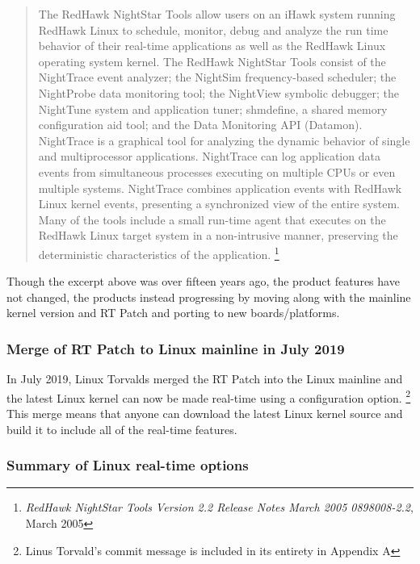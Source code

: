 \documentclass[12pt]{article}
\begin{document}
\begin{quote}
The RedHawk NightStar Tools allow users on an iHawk system running
RedHawk Linux to schedule, monitor, debug and analyze the run time behavior of
their real-time applications as well as the RedHawk Linux operating system
kernel.  The RedHawk NightStar Tools consist of the NightTrace event analyzer;
the NightSim frequency-based scheduler; the NightProbe data monitoring tool; the
NightView symbolic debugger; the NightTune system and application tuner;
shmdefine, a shared memory configuration aid tool; and the Data Monitoring API
(Datamon).  NightTrace is a graphical tool for analyzing the dynamic behavior of
single and multiprocessor applications. NightTrace can log application data
events from simultaneous processes executing on multiple CPUs or even multiple
systems. NightTrace combines application events with RedHawk Linux kernel
events, presenting a synchronized view of the entire system.  Many of the tools
include a small run-time agent that executes on the RedHawk Linux target system
in a non-intrusive manner, preserving the deterministic characteristics of the
application.%
\footnote{\emph{RedHawk NightStar Tools Version 2.2 Release Notes March 2005
0898008-2.2}, March 2005}
\end{quote}

Though the excerpt above was over fifteen years ago, the product features have
not changed, the products instead progressing by moving along with the mainline
kernel version and RT Patch and porting to new boards/platforms.

\subsubsection{Merge of RT Patch to Linux mainline in July 2019}
In July 2019, Linux Torvalds merged the RT Patch into the Linux mainline and the
latest Linux kernel can now be made real-time using a configuration option.%
\footnote{Linus Torvald's commit message is included in its entirety in Appendix
A}
This merge means that anyone can download the latest Linux kernel source and
build it to include all of the real-time features.

\subsubsection{Summary of Linux real-time options}
\end{document}
